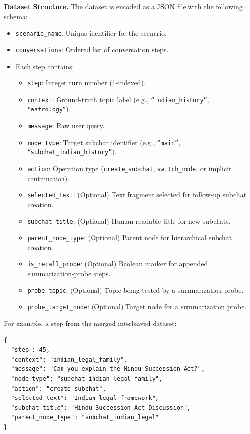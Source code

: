 \documentclass[pdflatex,sn-mathphys-num]{sn-jnl}%
\theoremstyle{thmstyleone}%
\theoremstyle{thmstyletwo}%
\theoremstyle{thmstylethree}%
\begin{document}
\textbf{Dataset Structure.}
The dataset is encoded as a JSON file with the following schema:
\begin{itemize}
    \item \texttt{scenario\_name}: Unique identifier for the scenario.
    \item \texttt{conversations}: Ordered list of conversation steps.
    \item Each step contains:
    \begin{itemize}
        \item \texttt{step}: Integer turn number (1-indexed).
        \item \texttt{context}: Ground-truth topic label (e.g., \texttt{``indian\_history''}, \texttt{``astrology''}).
        \item \texttt{message}: Raw user query.
        \item \texttt{node\_type}: Target subchat identifier (e.g., \texttt{``main''}, \texttt{``subchat\_indian\_history''}).
        \item \texttt{action}: Operation type (\texttt{create\_subchat}, \texttt{switch\_node}, or implicit continuation).
        \item \texttt{selected\_text}: (Optional) Text fragment selected for follow-up subchat creation.
        \item \texttt{subchat\_title}: (Optional) Human-readable title for new subchats.
        \item \texttt{parent\_node\_type}: (Optional) Parent node for hierarchical subchat creation.
        \item \texttt{is\_recall\_probe}: (Optional) Boolean marker for appended summarization-probe steps.
        \item \texttt{probe\_topic}: (Optional) Topic being tested by a summarization probe.
        \item \texttt{probe\_target\_node}: (Optional) Target node for a summarization probe.
    \end{itemize}
\end{itemize}

For example, a step from the merged interleaved dataset:
\begin{verbatim}
{
  "step": 45,
  "context": "indian_legal_family",
  "message": "Can you explain the Hindu Succession Act?",
  "node_type": "subchat_indian_legal_family",
  "action": "create_subchat",
  "selected_text": "Indian legal framework",
  "subchat_title": "Hindu Succession Act Discussion",
  "parent_node_type": "subchat_indian_legal"
}
\end{verbatim}
\end{document}
